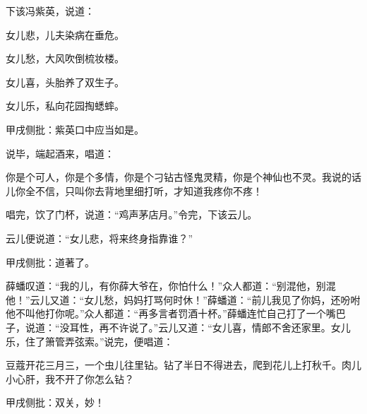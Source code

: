 \begin{parag}
    下该冯紫英，说道：
\end{parag}
\begin{poem}

    \begin{pl}

        女儿悲，儿夫染病在垂危。
    \end{pl}
    \begin{pl}

        女儿愁，大风吹倒梳妆楼。
    \end{pl}
    \begin{pl}

        女儿喜，头胎养了双生子。
    \end{pl}
    \begin{pl}

        女儿乐，私向花园掏蟋蟀。    \end{pl}\begin{note}甲戌侧批：紫英口中应当如是。\end{note}

\end{poem}
\begin{parag}
    说毕，端起酒来，唱道：
\end{parag}


\begin{poem}
    \begin{pl}
        你是个可人，你是个多情，你是个刁钻古怪鬼灵精，你是个神仙也不灵。我说的话儿你全不信，只叫你去背地里细打听，才知道我疼你不疼！
    \end{pl}
\end{poem}

\begin{parag}
    唱完，饮了门杯，说道：“鸡声茅店月。”令完，下该云儿。
\end{parag}


\begin{parag}
    云儿便说道：“女儿悲，将来终身指靠谁？”\begin{note}甲戌侧批：道著了。\end{note}薛蟠叹道：“我的儿，有你薛大爷在，你怕什么！”众人都道：“别混他，别混他！”云儿又道：“女儿愁，妈妈打骂何时休！”薛蟠道：“前儿我见了你妈，还吩咐他不叫他打你呢。”众人都道：“再多言者罚酒十杯。”薛蟠连忙自己打了一个嘴巴子，说道：“没耳性，再不许说了。”云儿又道：“女儿喜，情郎不舍还家里。女儿乐，住了箫管弄弦索。”说完，便唱道：
\end{parag}


\begin{poem}
    \begin{pl}
        豆蔻开花三月三，一个虫儿往里钻。钻了半日不得进去，爬到花儿上打秋千。肉儿小心肝，我不开了你怎么钻？\end{pl}
    \begin{note}甲戌侧批：双关，妙！\end{note}
\end{poem}

